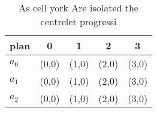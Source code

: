 \documentclass[a4paper]{article}
\begin{document}
\begin{table}
\begin{adjustbox}{width=0.6\columnwidth}
\begin{tabular}{|l|l|l|l|l|}
\hline
\textbf{plan} & \multicolumn{1}{c|}{\textbf{0}} & \multicolumn{1}{c|}{\textbf{1}} & \multicolumn{1}{c|}{\textbf{2}} & \multicolumn{1}{c|}{\textbf{3}} \\ \hline
\textbf{$a_0$}  & (0,0) & (1,0) & (2,0) & (3,0) \\ \hline
\textbf{$a_1$}  & (0,0) & (1,0) & (2,0) & (3,0) \\ \hline
\textbf{$a_2$}  & (0,0) & (1,0) & (2,0) & (3,0) \\ \hline
\end{tabular}
\end{adjustbox}
\caption{As cell york Are isolated the centrelet progressi
}
\end{table}
\end{document}
